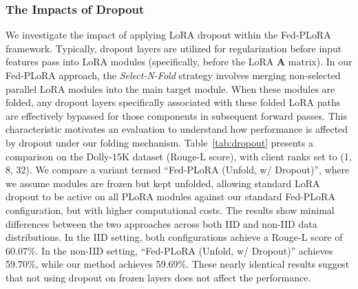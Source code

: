 \documentclass{article} %
\begin{document}
\subsubsection{The Impacts of Dropout}\label{appendixsubsection:dropout}


\begin{table}[h]
  \centering
  \caption{The impacts of dropout in the PLoRA.}
\renewcommand{\arraystretch}{1.2} 
  \label{tab:dropout}
\end{table}

We investigate the impact of applying LoRA dropout within the Fed-PLoRA framework. Typically, dropout layers are utilized for regularization before input features pass into LoRA modules (specifically, before the LoRA $\mathbf{A}$ matrix). In our Fed-PLoRA approach, the \textit{Select-N-Fold} strategy involves merging non-selected parallel LoRA modules into the main target module. When these modules are folded, any dropout layers specifically associated with these folded LoRA paths are effectively bypassed for those components in subsequent forward passes. This characteristic motivates an evaluation to understand how performance is affected by dropout under our folding mechanism.
%
Table~\ref{tab:dropout} presents a comparison on the Dolly-15K dataset (Rouge-L score), with client ranks set to (1, 8, 32). We compare a variant termed ``Fed-PLoRA (Unfold, w/ Dropout)'', where we assume modules are frozen but kept unfolded, allowing standard LoRA dropout to be active on all PLoRA modules against our standard Fed-PLoRA configuration, but with higher computational costs. The results show minimal differences between the two approaches across both IID and non-IID data distributions. In the IID setting, both configurations achieve a Rouge-L score of 60.07\%. In the non-IID setting, ``Fed-PLoRA (Unfold, w/ Dropout)'' achieves 59.70\%, while our method achieves 59.69\%. These nearly identical results suggest that not using dropout on frozen layers does not affect the performance.
\end{document}
